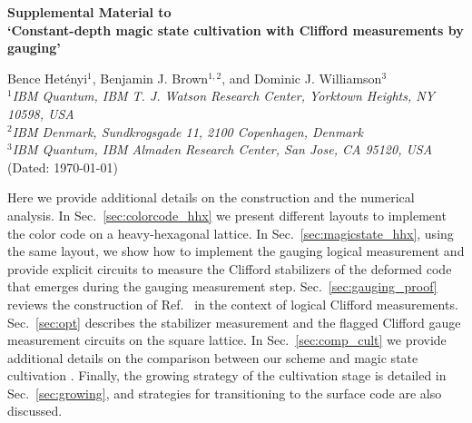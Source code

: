 \onecolumngrid
\pagebreak

\clearpage
\onecolumngrid
\vspace*{0.1cm}
\begin{center}
	\large{\bf Supplemental Material to \\`Constant-depth magic state cultivation with Clifford measurements by gauging'\\}
\end{center}
\begin{center}
	Bence Het\'enyi$^1$, Benjamin J. Brown$^{1,2}$, and Dominic J. Williamson$^3$ \\
    {\it \small $^1$IBM Quantum, IBM T. J. Watson Research Center, Yorktown Heights, NY 10598, USA\\
    $^2$IBM Denmark, Sundkrogsgade 11, 2100 Copenhagen, Denmark\\
    $^3$IBM Quantum, IBM Almaden Research Center, San Jose, CA 95120, USA
    }
    \\
	(Dated: \today)
\end{center}
\vspace*{0.1cm}

\onecolumngrid
\begin{center}
\parbox{400pt}{\small \hspace{5pt} Here we provide additional details on the construction and the numerical analysis.
In Sec.~\ref{sec:colorcode_hhx} we present different layouts to implement the color code on a heavy-hexagonal lattice. In Sec.~\ref{sec:magicstate_hhx}, using the same layout, we show how to implement the gauging logical measurement and provide explicit circuits to measure the Clifford stabilizers of the deformed code that emerges during the gauging measurement step. Sec.~\ref{sec:gauging_proof} reviews the construction of Ref.~\cite{williamsonLowoverheadFaulttolerantQuantum2024} in the context of logical Clifford measurements. Sec.~\ref{sec:opt} describes the stabilizer measurement and the flagged Clifford gauge measurement circuits on the square lattice. In Sec.~\ref{sec:comp_cult} we provide additional details on the comparison between our scheme and magic state cultivation \cite{chamberlandFaulttolerantMagicState2019,gidneyMagicStateCultivation2024}. Finally, the growing strategy of the cultivation stage is detailed in Sec.~\ref{sec:growing}, and strategies for transitioning to the surface code are also discussed.

}
\end{center}

\setcounter{equation}{0}
\setcounter{figure}{0}
\setcounter{table}{0}
\setcounter{section}{0}
\setcounter{page}{1}

